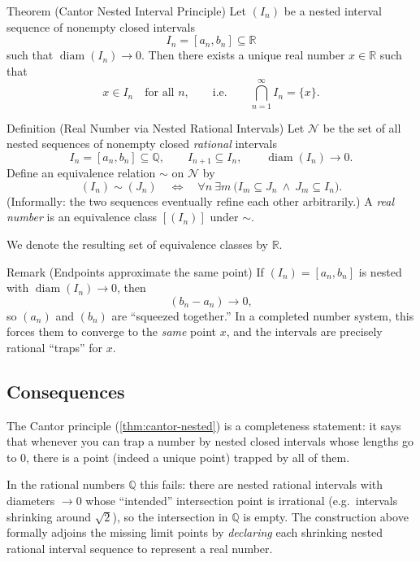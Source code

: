 \begin{theorembox}{Theorem (Cantor Nested Interval Principle)}
\label{thm:cantor-nested}
Let $(I_n)$ be a nested interval sequence of nonempty closed intervals
\[
I_n=[a_n,b_n] \subseteq \mathbb{R}
\]
such that $\operatorname{diam}(I_n)\to 0$.
Then there exists a unique real number $x\in\mathbb{R}$ such that
\[
x\in I_n \quad\text{for all } n,
\qquad\text{i.e.}\qquad
\bigcap_{n=1}^\infty I_n = \{x\}.
\]
\end{theorembox}

\begin{definitionbox}{Definition (Real Number via Nested Rational Intervals)}
\label{def:real-as-nested}
Let $\mathcal{N}$ be the set of all nested sequences of nonempty closed
\emph{rational} intervals
\[
I_n=[a_n,b_n]\subseteq \mathbb{Q},
\qquad I_{n+1}\subseteq I_n,
\qquad \operatorname{diam}(I_n)\to 0.
\]
Define an equivalence relation $\sim$ on $\mathcal{N}$ by
\[
(I_n)\sim(J_n)
\quad\Longleftrightarrow\quad
\forall n\ \exists m\ \bigl(I_m\subseteq J_n \ \wedge\  J_m\subseteq I_n\bigr).
\]
(Informally: the two sequences eventually refine each other arbitrarily.)
A \emph{real number} is an equivalence class $[(I_n)]$ under $\sim$.

We denote the resulting set of equivalence classes by $\mathbb{R}$.
\end{definitionbox}

\begin{propositionbox}{Remark (Endpoints approximate the same point)}
If $(I_n)=[a_n,b_n]$ is nested with $\operatorname{diam}(I_n)\to 0$, then
\[
(b_n-a_n)\to 0,
\]
so $(a_n)$ and $(b_n)$ are ``squeezed together.'' In a completed number system,
this forces them to converge to the \emph{same} point $x$, and the intervals
are precisely rational ``traps'' for $x$.
\end{propositionbox}


\subsection*{Consequences}

\begin{remark*}
The Cantor principle (\autoref{thm:cantor-nested}) is a completeness statement:
it says that whenever you can trap a number by nested closed intervals whose
lengths go to $0$, there is a point (indeed a unique point) trapped by all of them.

In the rational numbers $\mathbb{Q}$ this fails: there are nested rational
intervals with diameters $\to 0$ whose ``intended'' intersection point is
irrational (e.g.\ intervals shrinking around $\sqrt{2}$), so the intersection
in $\mathbb{Q}$ is empty. The construction above formally adjoins the missing
limit points by \emph{declaring} each shrinking nested rational interval
sequence to represent a real number.
\end{remark*}

